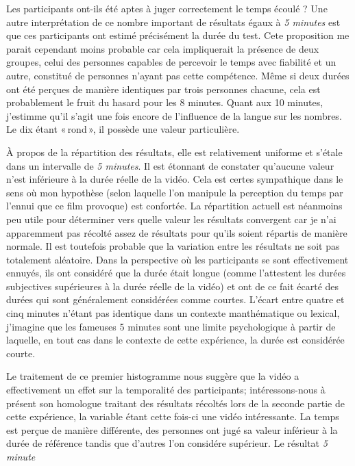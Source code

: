 \documentclass[12pt,fleqn,oneside,openany]{book} %
\begin{document}
Les participants ont-ils été aptes à juger correctement le temps écoulé ? Une autre interprétation de ce nombre important de résultats égaux à \emph{5 minutes} est que ces participants ont estimé précisément la durée du test. Cete proposition me parait cependant moins probable car cela impliquerait la présence de deux groupes, celui des personnes capables de percevoir le temps avec fiabilité et un autre, constitué de personnes n'ayant pas cette compétence. Même si deux durées ont été perçues de manière identiques par trois personnes chacune, cela est probablement le fruit du hasard pour les 8 minutes. Quant aux 10 minutes, j'estimme qu'il s'agit une fois encore de l'influence de la langue sur les nombres. Le dix étant «\,rond\,», il possède une valeur particulière.

À propos de la répartition des résultats, elle est relativement uniforme et s'étale dans un intervalle de \emph{5 minutes}. Il est étonnant de constater qu'aucune valeur n'est inférieure à la durée réelle de la vidéo. Cela est certes sympathique dans le sens où mon hypothèse (selon laquelle l'on manipule la perception du temps par l'ennui que ce film provoque) est confortée. La répartition actuell est néanmoins peu utile pour déterminer vers quelle valeur les résultats convergent car je n'ai apparemment pas récolté assez de résultats pour qu'ils soient répartis de manière normale. Il est toutefois probable que la variation entre les résultats ne soit pas totalement aléatoire. Dans la perspective où les participants se sont effectivement ennuyés, ils ont considéré que la durée était longue (comme l'attestent les durées subjectives supérieures à la durée réelle de la vidéo) et ont de ce fait écarté des durées qui sont généralement considérées comme courtes. L'écart entre quatre et cinq minutes n'étant pas identique dans un contexte manthématique ou lexical, j'imagine que les fameuses 5 minutes sont une limite psychologique à partir de laquelle, en tout cas dans le contexte de cette expérience, la durée est considérée courte. 

Le traitement de ce premier histogramme nous suggère que la vidéo a effectivement un effet sur la temporalité des participants; intéressons-nous à présent son homologue traitant des résultats récoltés lors de la seconde partie de cette expérience, la variable étant cette fois-ci une vidéo intéressante. La temps est perçue de manière différente, des personnes ont jugé sa valeur inférieur à la durée de référence tandis que d'autres l'on considére supérieur. Le résultat \emph{5 minute}
\end{document}
